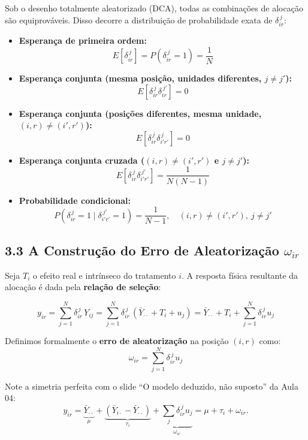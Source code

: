 \documentclass[
]{article}
\begin{document}
Sob o desenho totalmente aleatorizado (DCA), todas as combinações de
alocação são equiprováveis. Disso decorre a distribuição de
probabilidade exata de \(\delta_{ir}^{\,j}\):

\begin{itemize}
\item
  \textbf{Esperança de primeira ordem:}
  \[E[\delta_{ir}^{\,j}] = P(\delta_{ir}^{\,j} = 1) = \frac{1}{N}\]
\item
  \textbf{Esperança conjunta (mesma posição, unidades diferentes,
  \(j \neq j'\)):} \[E[\delta_{ir}^{\,j}\delta_{ir}^{\,j'}] = 0\]
\item
  \textbf{Esperança conjunta (posições diferentes, mesma unidade,
  \((i,r) \neq (i',r')\)):}
  \[E[\delta_{ir}^{\,j}\delta_{i'r'}^{\,j}] = 0\]
\item
  \textbf{Esperança conjunta cruzada (\((i,r) \neq (i',r')\) e
  \(j \neq j'\)):}
  \[E[\delta_{ir}^{\,j}\delta_{i'r'}^{\,j'}] = \frac{1}{N(N-1)}\]
\item
  \textbf{Probabilidade condicional:}
  \[P(\delta_{ir}^{\,j}=1 \mid \delta_{i'r'}^{\,j'}=1) = \frac{1}{N-1}, \quad (i,r) \neq (i',r'),\ j \neq j'\]
\end{itemize}

\subsection{\texorpdfstring{3.3 A Construção do Erro de Aleatorização
\(\omega_{ir}\)}{3.3 A Construção do Erro de Aleatorização \textbackslash omega\_\{ir\}}}\label{a-construuxe7uxe3o-do-erro-de-aleatorizauxe7uxe3o-omega_ir}

Seja \(T_i\) o efeito real e intrínseco do tratamento \(i\). A resposta
física resultante da alocação é dada pela \textbf{relação de seleção}:

\[y_{ir} = \sum_{j=1}^{N} \delta_{ir}^{\,j}\, Y_{ij} = \sum_{j=1}^{N} \delta_{ir}^{\,j}\,(\bar Y_{\cdot\cdot} + T_i + u_j) = \bar Y_{\cdot\cdot} + T_i + \sum_{j=1}^{N} \delta_{ir}^{\,j} u_j\]

Definimos formalmente o \textbf{erro de aleatorização} na posição
\((i,r)\) como: \[\omega_{ir} = \sum_{j=1}^{N} \delta_{ir}^{\,j} u_j\]

Note a simetria perfeita com o slide ``O modelo deduzido, não suposto''
da Aula 04:
\[y_{ir} = \underbrace{\bar Y_{\cdot\cdot}}_{\mu} + \underbrace{(\bar Y_{i\cdot} - \bar Y_{\cdot\cdot})}_{\tau_i} + \underbrace{\sum_j \delta_{ir}^{\,j} u_j}_{\omega_{ir}} = \mu + \tau_i + \omega_{ir}.\]
\end{document}
